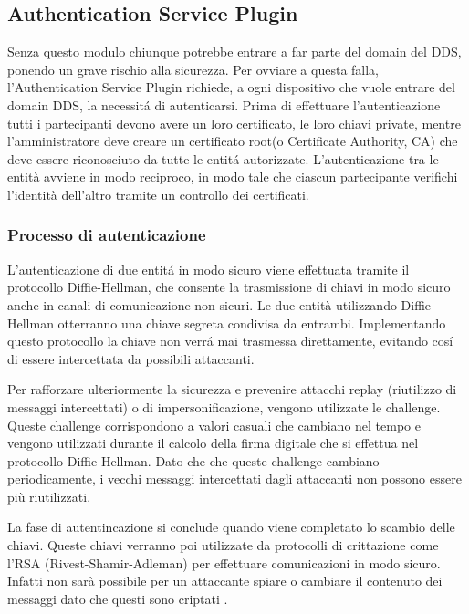 \subsection{Authentication Service Plugin}
Senza questo modulo chiunque potrebbe entrare a far parte del domain
del DDS, ponendo un grave rischio alla sicurezza. Per ovviare a questa
falla, l'Authentication Service Plugin richiede, a ogni dispositivo che 
vuole entrare del domain DDS, la necessitá di autenticarsi.
Prima di effettuare l'autenticazione tutti i partecipanti devono 
avere un loro certificato, le loro chiavi private, mentre 
l'amministratore deve creare un certificato root(o Certificate Authority, CA) 
che deve essere riconosciuto da tutte le entitá autorizzate. 
L'autenticazione tra le entità avviene in modo reciproco, 
in modo tale che ciascun partecipante verifichi l'identità dell'altro
tramite un controllo dei certificati.


\subsubsection{Processo di autenticazione}
L'autenticazione di due entitá in modo sicuro viene effettuata
tramite il protocollo Diffie-Hellman, che consente la trasmissione 
di chiavi in modo sicuro anche in canali di comunicazione non sicuri.
Le due entità utilizzando Diffie-Hellman otterranno una chiave 
segreta condivisa da entrambi. Implementando questo 
protocollo la chiave non verrá mai 
trasmessa direttamente, evitando cosí di essere intercettata da 
possibili attaccanti. 

Per rafforzare ulteriormente la sicurezza e prevenire attacchi replay 
(riutilizzo di messaggi intercettati) o di impersonificazione, vengono 
utilizzate le challenge. Queste challenge corrispondono a valori 
casuali che cambiano nel tempo e vengono utilizzati durante il 
calcolo della firma digitale che si effettua nel protocollo
Diffie-Hellman.
Dato che che queste challenge cambiano periodicamente,
i vecchi messaggi intercettati dagli attaccanti non possono essere 
più riutilizzati.

La fase di autentincazione si conclude quando viene completato
lo scambio delle chiavi.
Queste chiavi verranno poi utilizzate da protocolli di 
crittazione come l'RSA (Rivest-Shamir-Adleman) per effettuare 
comunicazioni in modo sicuro. Infatti non sarà possibile per un 
attaccante spiare o cambiare il contenuto dei messaggi dato 
che questi sono criptati 
\cite{DBLP:conf/asiaccs/WangLG24}.
\label{Processo di autenticazione}

